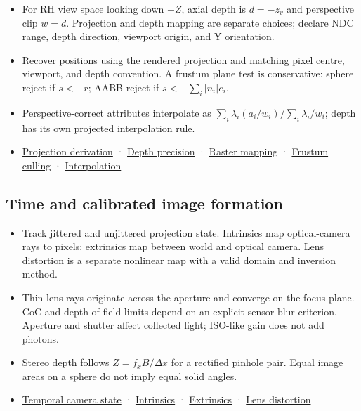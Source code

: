 \begin{itemize}
\tightlist
\item
  For RH view space looking down \(-Z\), axial depth is \(d=-z_v\) and perspective clip \(w=d\). Projection and depth mapping are separate choices; declare NDC range, depth direction, viewport origin, and Y orientation.
\item
  Recover positions using the rendered projection and matching pixel centre, viewport, and depth convention. A frustum plane test is conservative: sphere reject if \(s<-r\); AABB reject if \(s<-\sum_i|n_i|e_i\).
\item
  Perspective-correct attributes interpolate as \(\sum_i\lambda_i(a_i/w_i)/\sum_i\lambda_i/w_i\); depth has its own projected interpolation rule.
\item
  \hyperref[02-foundations-ii-ch033-projection-turns-rays-into-clip-coordinates]{Projection derivation} · \hyperref[02-foundations-ii-ch033-depth-is-a-numerical-design-choice]{Depth precision} · \hyperref[02-foundations-ii-ch033-a-projected-point-still-needs-a-raster-convention]{Raster mapping} · \hyperref[02-foundations-ii-ch034-the-viewing-volume-is-six-half-spaces]{Frustum culling} · \hyperref[02-foundations-ii-ch034-raster-interpolation-remembers-homogeneous-depth]{Interpolation}
\end{itemize}

\subsection{Time and calibrated image formation}\label{appendix-a2b71a18f5a2-time-and-calibrated-image-formation}

\begin{itemize}
\tightlist
\item
  Track jittered and unjittered projection state. Intrinsics map optical-camera rays to pixels; extrinsics map between world and optical camera. Lens distortion is a separate nonlinear map with a valid domain and inversion method.
\item
  Thin-lens rays originate across the aperture and converge on the focus plane. CoC and depth-of-field limits depend on an explicit sensor blur criterion. Aperture and shutter affect collected light; ISO-like gain does not add photons.
\item
  Stereo depth follows \(Z=f_xB/\Delta x\) for a rectified pinhole pair. Equal image areas on a sphere do not imply equal solid angles.
\item
  \hyperref[02-foundations-ii-ch036-a-camera-image-changes-over-time]{Temporal camera state} · \hyperref[02-foundations-ii-ch034-intrinsics-map-optical-rays-to-pixels]{Intrinsics} · \hyperref[02-foundations-ii-ch035-extrinsics-place-the-optical-camera-in-the-world]{Extrinsics} · \hyperref[02-foundations-ii-ch035-real-lenses-bend-the-pinhole-image]{Lens distortion}
\end{itemize}

